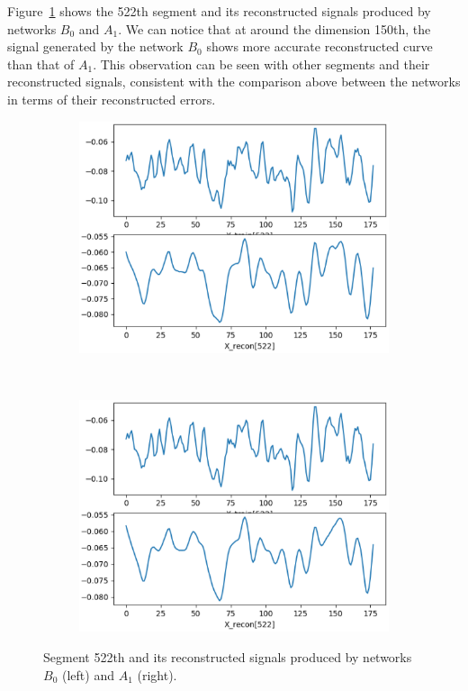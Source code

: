\documentclass[12pt]{article}
\begin{document}
Figure~\ref{fig:reconstructed_inputs_comparison} shows the 522th segment and its reconstructed signals produced by networks $B_0$ and $A_1$. We can notice that at around the dimension 150th, the signal generated by the network $B_0$ shows more accurate reconstructed curve than that of $A_1$. This observation can be seen with other segments and their reconstructed signals, consistent with the comparison above between the networks in terms of their reconstructed errors.
\begin{figure}
\begin{subfigure}{.5\textwidth}
  \centering
  \includegraphics[width=.8\linewidth]{figures/clean_input_example_522.eps}
\end{subfigure}%
~
\begin{subfigure}{.5\textwidth}
  \centering
  \includegraphics[width=.8\linewidth]{figures/corrupted_input_example_522.eps}
\end{subfigure}
\caption{Segment 522th and its reconstructed signals produced by networks $B_0$ (left) and $A_1$ (right).}
\label{fig:reconstructed_inputs_comparison}
\end{figure}
\end{document}
